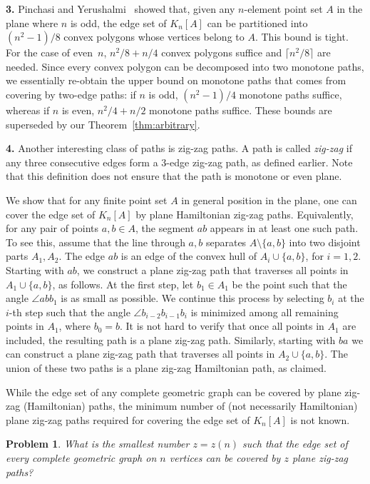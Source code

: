 \documentclass[a4paper,USenglish]{lipics-v2021}
\newtheorem{problem}[theorem]{Problem}
\begin{document}
\smallskip
\noindent\textbf{3. } Pinchasi and Yerushalmi~\cite{PY24} showed that, given any $n$-element point set $A$
in the plane where $n$ is odd, the edge set of $K_n[A]$ can be partitioned into $(n^2-1)/8$ convex polygons whose vertices belong to $A$. This bound is tight. For the case of even~$n$, $n^2/8 + n/4$
convex polygons suffice and $\lceil n^2/8 \rceil$ are needed. Since every convex polygon can be decomposed
into two monotone paths, we essentially re-obtain the upper bound on monotone paths that comes from covering
by two-edge paths: if $n$ is odd, $(n^2-1)/4$ monotone paths suffice, whereas if $n$ is even,
$n^2/4 + n/2$ monotone paths suffice. These bounds are superseded by our Theorem~\ref{thm:arbitrary}.

\smallskip
\noindent\textbf{4. }
Another interesting class of paths is zig-zag paths. A path is called \emph{zig-zag}
if any three consecutive edges form a $3$-edge zig-zag path, as defined earlier.
Note that this definition does not ensure that the path is monotone or even plane.  

We show that for any finite point set $A$ in general position in the
plane, one can cover the edge set of $K_n[A]$ by plane Hamiltonian
zig-zag paths. Equivalently, for any pair of points $a,b \in A$, the
segment $ab$ appears in at least one such path. To see this, assume
that the line through $a,b$ separates $A\setminus \{a,b\}$ into two
disjoint parts $A_1,A_2$. The edge $ab$ is an edge of the convex hull
of $A_i \cup \{a,b\}$, for $i=1,2$. Starting with $ab$, we construct a
plane zig-zag path that traverses all points in $A_1 \cup \{a,b\}$, as
follows. At the first step, let $b_1 \in A_1$ be the point such that
the angle $\angle abb_1$ is as small as possible. We continue this
process by selecting $b_i$ at the $i$-th step such that the angle
$\angle b_{i-2}b_{i-1}b_i$ is minimized among all remaining points in
$A_1$, where $b_0=b$. It is not hard to verify that once all points
in $A_1$ are included, the resulting path is a plane zig-zag
path. Similarly, starting with $ba$ we can construct a plane zig-zag
path that traverses all points in $A_2 \cup \{a,b\}$. The union of
these two paths is a plane zig-zag Hamiltonian path, as claimed.

While the edge set of any complete geometric graph can be covered by plane
zig-zag (Hamiltonian) paths, the minimum number of  
(not necessarily Hamiltonian) plane zig-zag paths required for covering the edge set of $K_n[A]$ is not known.

\begin{problem}
    What is the smallest number $z=z(n)$ such that the edge set of every
    complete geometric graph on $n$ vertices can be covered by $z$ plane zig-zag paths? 
\end{problem}
\end{document}
